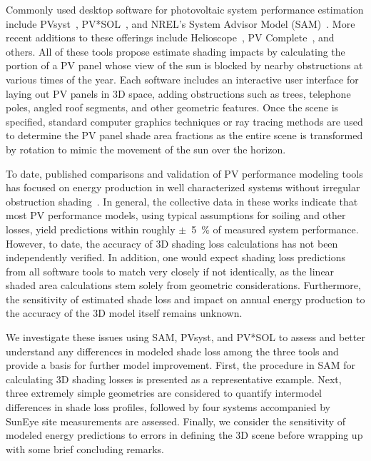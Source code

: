 \documentclass[twocolumn,10pt]{asme2ej}
\begin{document}
Commonly used desktop software for photovoltaic system performance estimation include PVsyst~\cite{pvsyst}, PV*SOL~\cite{pvsol}, and NREL's System Advisor Model (SAM)~\cite{sam}.  More recent additions to these offerings include Helioscope~\cite{helioscope}, PV Complete~\cite{pvcomplete}, and others.  All of these tools propose estimate shading impacts by calculating the portion of a PV panel whose view of the sun is blocked by nearby obstructions at various times of the year.  Each software includes an interactive user interface for laying out PV panels in 3D space, adding obstructions such as trees, telephone poles, angled roof segments, and other geometric features.  Once the scene is specified, standard computer graphics techniques or ray tracing methods are used to determine the PV panel shade area fractions as the entire scene is transformed by rotation to mimic the movement of the sun over the horizon.

To date, published comparisons and validation of PV performance modeling tools has focused on energy production in well characterized systems without irregular obstruction shading~\cite{blair2013,freeman2013,freeman2014,haroon2012,yates2010}.  In general, the collective data in these works indicate that most PV performance models, using typical assumptions for soiling and other losses, yield predictions within roughly $\pm$~5~\% of measured system performance.  However, to date, the accuracy of 3D shading loss calculations has not been independently verified.  In addition, one would expect shading loss predictions from all software tools to match very closely if not identically, as the linear shaded area calculations stem solely from geometric considerations.  Furthermore, the sensitivity of estimated shade loss and impact on annual energy production to the accuracy of the 3D model itself remains unknown.

We investigate these issues using SAM, PVsyst, and PV*SOL to assess and better understand any differences in modeled shade loss among the three tools and provide a basis for further model improvement.  First, the procedure in SAM for calculating 3D shading losses is presented as a representative example.  Next, three extremely simple geometries are considered to quantify intermodel differences in shade loss profiles, followed by four systems accompanied by SunEye site measurements are assessed.  Finally, we consider the sensitivity of modeled energy predictions to errors in defining the 3D scene before wrapping up with some brief concluding remarks.
\end{document}
